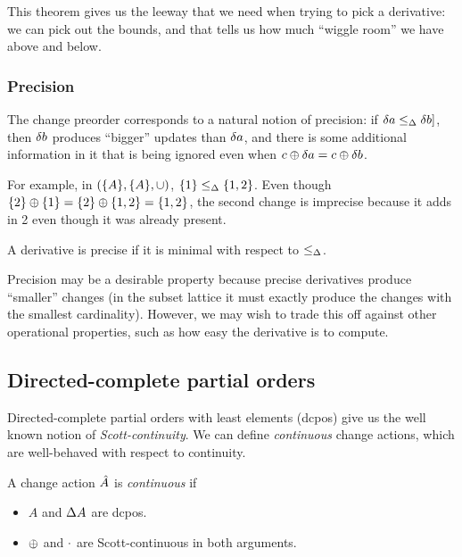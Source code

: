 This theorem gives us the leeway that we need when trying to pick a derivative: we can pick out the
bounds, and that tells us how much ``wiggle room'' we have above and below.

\subsubsection{Precision}

The change preorder corresponds to a natural notion of precision: if $\delta a
\leq_\Delta \delta b]$, then $\delta b$ produces ``bigger'' updates than
$\delta a$, and there is some additional information in it that is being
ignored even when $c \oplus \delta a = c \oplus \delta b$.

For example, in $(\{A\},\{A\},\cup)$, $\{1\} \leq_\Delta \{1,2\}$. Even
though $\{2\} \oplus \{1\} = \{2\} \oplus \{1,2\} = \{1,2\}$, the second change is
imprecise because it adds in 2 even though it was already present.


\begin{defn}
  \label{def:precision}
  A derivative is precise if it is minimal with respect to $\leq_\Delta$.
\end{defn}

Precision may be a desirable property because precise derivatives produce
``smaller'' changes (in the subset lattice it must exactly produce the changes
with the smallest cardinality). However, we may wish to trade this off against
other operational properties, such as how easy the derivative is to compute.

\subsection{Directed-complete partial orders}

Directed-complete partial orders with least elements (dcpos) give us the well known notion of
\emph{Scott-continuity}. We can define \emph{continuous} change actions,
which are well-behaved with respect to continuity.

\begin{defn}
  A change action $\hat{A}$ is \emph{continuous} if
  \begin{itemize}
    \item $A$ and $\Delta A$ are dcpos.
    \item $\oplus$ and $\cdot$ are Scott-continuous in both arguments.
  \end{itemize}
\end{defn}

